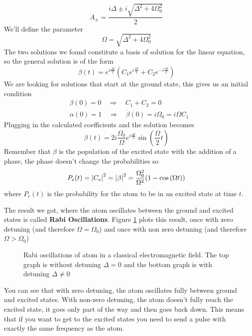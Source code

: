 \[
    A_{\pm} = \frac{i \Delta \pm i\sqrt{\Delta^2 + 4\Omega_0^2}}{2}
\]
We'll define the parameter
\[
    \Omega = \sqrt{\Delta^2 + 4\Omega_0^2}
\]
The two solutions we found constitute a basis of solution for the linear equation, so the general solution is of the form
\[
    \beta (t) = e^{i\frac{\Delta t}{2}} (C_1 e^{i \frac{\Omega t}{2}} + C_2 e^{-i \frac{\Omega t}{2}})
\]
We are looking for solutions that start at the ground state, this gives us an initial condition
\begin{align*}
    &\beta (0) = 0 \quad \Rightarrow \quad C_1 + C_2 = 0 \\
    &\alpha (0) = 1 \quad \Rightarrow \quad \dot{\beta} (0) = i \Omega_0 = i \Omega C_1
\end{align*}
Plugging in the calculated coefficients and the solution becomes
\[
    \beta (t) = 2 i \frac{\Omega_0}{\Omega}e^{i \frac{\Delta t}{2}} \sin{ (\frac{\Omega}{2}t)}
\]
Remember that $\beta$ is the population of the excited state with the addition of a phase, the phase doesn't change the probabilities so
\[
    P_e (t) = \abs{C_e}^2 = \abs{\beta}^2 = \frac{\Omega_0^2}{\Omega^2} (1 - \cos{ (\Omega t)})
\]
where $P_e (t)$ is the probability for the atom to be in an excited state at time $t$.

The result we got, where the atom oscillates between the ground and excited states is called \textbf{Rabi Oscillations}. Figure \ref{fig:rabi-oscillations} plots this result, once with zero detuning (and therefore $\Omega = \Omega_0$) and once with non zero detuning (and therefore $\Omega > \Omega_0$)
\begin{figure}[H]
    \begin{center}
        
    \end{center}
    \caption{Rabi oscillations of atom in a classical electromagnetic field. The top graph is without detuning $\Delta = 0$ and the bottom graph is with detuning $\Delta \ne 0$}
    \label{fig:rabi-oscillations}
\end{figure}
You can see that with zero detuning, the atom oscillates fully between ground and excited states. With non-zero detuning, the atom doesn't fully reach the excited state, it goes only part of the way and then goes back down. This means that if you want  to get to the excited states you need to send a pulse with exactly the same frequency as the atom.

